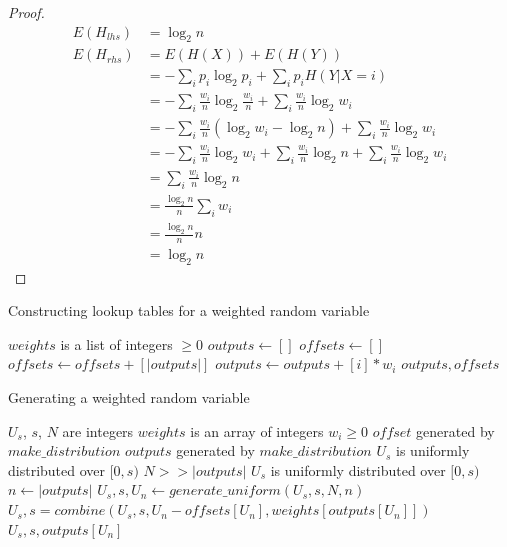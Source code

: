 \documentclass[12pt]{article}
\begin{document}
\begin{proof}
    \begin{align}
    E(H_{lhs}) & = \log_2 n \\
    E(H_{rhs}) & = E(H(X)) + E(H(Y)) \\ 
               & = - \sum_i p_i \log_2p_i + \sum_i p_iH(Y|X=i) \\
               & = - \sum_i \frac{w_i}{n} \log_2 \frac{w_i}{n} + \sum_i \frac{w_i}{n}\log_2 w_i \\
               & = - \sum_i \frac{w_i}{n}(\log_2 w_i - \log_2 n) + \sum_i \frac{w_i}{n}\log_2 w_i \\
               & = - \sum_i \frac{w_i}{n}\log_2 w_i + \sum_i \frac{w_i}{n} \log_2 n + \sum_i \frac{w_i}{n}\log_2 w_i \\
               & = \sum_i \frac{w_i}{n} \log_2 n \\
               & = \frac{\log_2 n}{n} \sum_i w_i \\
               & = \frac{\log_2 n}{n} n \\
               & = \log_2 n
    \end{align}
\end{proof}

\begin{algorithm}
\caption{Constructing lookup tables for a weighted random variable}
\label{alg:generate-lookup-tables}
\begin{algorithmic}[1]
\Require $weights$ is a list of integers $\ge0$
  \State $outputs \gets []$
  \State $offsets \gets []$
    \State $offsets \gets offsets + [|outputs|]$
    \State $outputs \gets outputs + [i] * w_i$
  \EndFor
  \State \Return $outputs, offsets$
\EndProcedure
\end{algorithmic}
\end{algorithm}


\begin{algorithm}
\caption{Generating a weighted random variable}
\label{alg:generate-distribution}
\begin{algorithmic}[1]
\Require $U_s$, $s$, $N$ are integers
\Require $weights$ is an array of integers $w_i \ge 0$
\Require $offset$ generated by $make\_distribution$ 
\Require $outputs$ generated by $make\_distribution$
\Require $U_s$ is uniformly distributed over $[0,s)$
\Require $N >> |outputs|$
\Ensure $U_s$ is uniformly distributed over $[0,s)$
    \State $n \gets |outputs|$
    \State $U_s, s, U_n \gets generate\_uniform(U_s, s, N, n)$
    \State $U_s, s = combine(U_s, s, U_n - offsets[U_n], weights[outputs[U_n]])$
    \State \Return $U_s, s, outputs[U_n]$
\EndProcedure
\end{algorithmic}
\end{algorithm}
\end{document}
